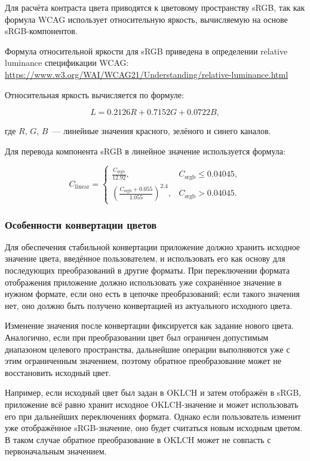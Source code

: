 Для расчёта контраста цвета приводятся к цветовому пространству sRGB, так как формула WCAG использует относительную яркость, вычисляемую на основе sRGB-компонентов.

Формула относительной яркости для sRGB приведена в определении relative luminance спецификации WCAG:
\url{https://www.w3.org/WAI/WCAG21/Understanding/relative-luminance.html}

Относительная яркость вычисляется по формуле:

\[
L = 0.2126R + 0.7152G + 0.0722B,
\]

где \(R\), \(G\), \(B\)~--- линейные значения красного, зелёного и синего каналов.

Для перевода компонента sRGB в линейное значение используется формула:

\[
C_{\text{linear}} =
\begin{cases}
\frac{C_{\text{srgb}}}{12.92}, & C_{\text{srgb}} \leq 0.04045,\\
\left(\frac{C_{\text{srgb}} + 0.055}{1.055}\right)^{2.4}, & C_{\text{srgb}} > 0.04045.
\end{cases}
\]

\subsubsection*{Особенности конвертации цветов}

Для обеспечения стабильной конвертации приложение должно хранить исходное значение цвета, введённое пользователем, и использовать его как основу для последующих преобразований в другие форматы. При переключении формата отображения приложение должно использовать уже сохранённое значение в нужном формате, если оно есть в цепочке преобразований; если такого значения нет, оно должно быть получено конвертацией из актуального исходного цвета.

Изменение значения после конвертации фиксируется как задание нового цвета. Аналогично, если при преобразовании цвет был ограничен допустимым диапазоном целевого пространства, дальнейшие операции выполняются уже с этим ограниченным значением, поэтому обратное преобразование может не восстановить исходный цвет.

Например, если исходный цвет был задан в OKLCH и затем отображён в sRGB, приложение всё равно хранит исходное OKLCH-значение и может использовать его при дальнейших переключениях формата. Однако если пользователь изменит уже отображённое sRGB-значение, оно будет считаться новым исходным цветом. В таком случае обратное преобразование в OKLCH может не совпасть с первоначальным значением.

